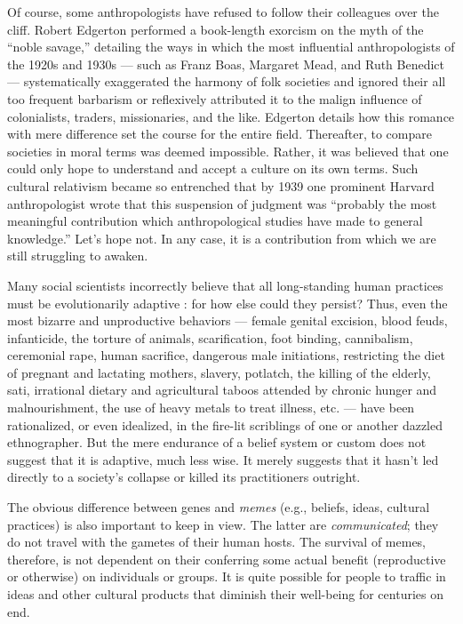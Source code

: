 \documentclass[a4paper,14pt]{extarticle}
\begin{document}
Of course, some anthropologists have refused to follow their colleagues over the cliff.
Robert Edgerton performed a book-length exorcism on the myth of the ``noble savage,'' detailing the ways in which the most influential anthropologists of the 1920s and 1930s --- such as Franz Boas, Margaret Mead, and Ruth Benedict --- systematically exaggerated the harmony of folk societies and ignored their all too frequent barbarism or reflexively attributed it to the malign influence of colonialists, traders, missionaries, and the like.
Edgerton details how this romance with mere difference set the course for the entire field.
Thereafter, to compare societies in moral terms was deemed impossible.
Rather, it was believed that one could only hope to understand and accept a culture on its own terms.
Such cultural relativism became so entrenched that by 1939 one prominent Harvard anthropologist wrote that this suspension of judgment was ``probably the most meaningful contribution which anthropological studies have made to general knowledge.''
Let's hope not.
In any case, it is a contribution from which we are still struggling to awaken.

Many social scientists incorrectly believe that all long-standing human practices must be evolutionarily adaptive :
for how else could they persist?
Thus, even the most bizarre and unproductive behaviors --- female genital excision, blood feuds, infanticide, the torture of animals, scarification, foot binding, cannibalism, ceremonial rape, human sacrifice, dangerous male initiations, restricting the diet of pregnant and lactating mothers, slavery, potlatch, the killing of the elderly, sati, irrational dietary and agricultural taboos attended by chronic hunger and malnourishment, the use of heavy metals to treat illness, etc. --- have been rationalized, or even idealized, in the fire-lit scriblings of one or another dazzled ethnographer.
But the mere endurance of a belief system or custom does not suggest that it is adaptive, much less wise.
It merely suggests that it hasn't led directly to a society's collapse or killed its practitioners outright.

The obvious difference between genes and \textit{memes} (e.g., beliefs, ideas, cultural practices) is also important to keep in view.
The latter are \textit{communicated};
they do not travel with the gametes of their human hosts.
The survival of memes, therefore, is not dependent on their conferring some actual benefit (reproductive or otherwise) on individuals or groups.
It is quite possible for people to traffic in ideas and other cultural products that diminish their well-being for centuries on end.
\end{document}
